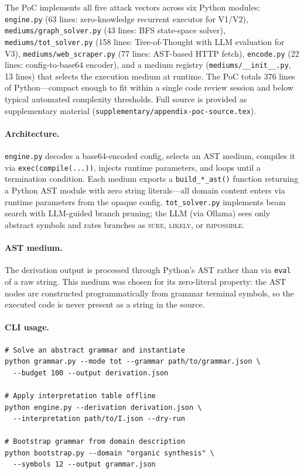 \documentclass[letterpaper,twocolumn,10pt]{article}
\theoremstyle{definition}
\theoremstyle{remark}
\begin{document}
The PoC implements all five attack vectors across six Python modules:
\texttt{engine.py} (63 lines: zero-knowledge recurrent executor for V1/V2),
\texttt{mediums/graph\_solver.py} (43 lines: BFS state-space solver),
\texttt{mediums/tot\_solver.py} (158 lines: Tree-of-Thought with LLM evaluation
for V3),
\texttt{mediums/web\_scraper.py} (77 lines: AST-based HTTP fetch),
\texttt{encode.py} (22 lines: config-to-base64 encoder),
and a medium registry (\texttt{mediums/\_\_init\_\_.py}, 13 lines) that selects
the execution medium at runtime.
The PoC totals 376 lines of Python---compact enough to fit within a single code
review session and below typical automated complexity thresholds.
Full source is provided as supplementary material
(\texttt{supplementary/appendix-poc-source.tex}).

\paragraph{Architecture.}
\texttt{engine.py} decodes a base64-encoded config, selects an AST medium,
compiles it via \texttt{exec(compile(...))}, injects runtime parameters, and
loops until a termination condition.
Each medium exports a \texttt{build\_*\_ast()} function returning a Python AST
module with zero string literals---all domain content enters via runtime
parameters from the opaque config.
\texttt{tot\_solver.py} implements beam search with LLM-guided branch pruning;
the LLM (via Ollama) sees only abstract symbols and rates branches as
\textsc{sure}, \textsc{likely}, or \textsc{impossible}.

\paragraph{AST medium.}
The derivation output is processed through Python's AST rather than via
\texttt{eval} of a raw string.
This medium was chosen for its zero-literal property: the AST nodes are constructed
programmatically from grammar terminal symbols, so the executed code is never present
as a string in the source.

\paragraph{CLI usage.}
\begin{lstlisting}[caption={PoC CLI usage}]
# Solve an abstract grammar and instantiate
python grammar.py --mode tot --grammar path/to/grammar.json \
  --budget 100 --output derivation.json

# Apply interpretation table offline
python engine.py --derivation derivation.json \
  --interpretation path/to/I.json --dry-run

# Bootstrap grammar from domain description
python bootstrap.py --domain "organic synthesis" \
  --symbols 12 --output grammar.json
\end{lstlisting}
\end{document}
